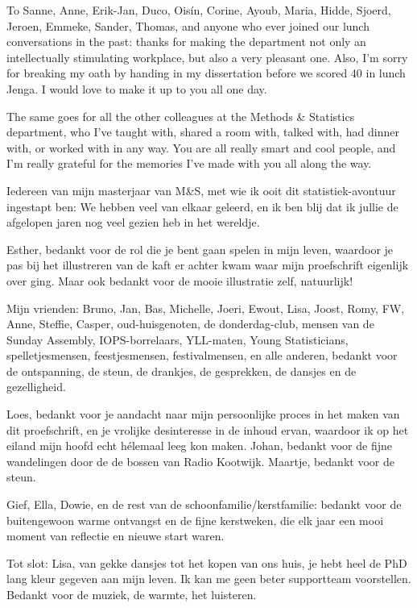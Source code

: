 \documentclass[12pt, a4paper]{book}\usepackage[]{graphicx}\usepackage{xcolor}
\begin{document}
To Sanne, Anne, Erik-Jan, Duco, Ois\'in, Corine, Ayoub, Maria, Hidde, Sjoerd, Jeroen, Emmeke, Sander, Thomas, and anyone who ever joined our lunch conversations in the past: thanks for making the department not only an intellectually stimulating workplace, but also a very pleasant one. Also, I'm sorry for breaking my oath by handing in my dissertation before we scored 40 in lunch Jenga. I would love to make it up to you all one day.

The same goes for all the other colleagues at the Methods \& Statistics department, who I've taught with, shared a room with, talked with, had dinner with, or worked with in any way. You are all really smart and cool people, and I'm really grateful for the memories I've made with you all along the way.

\vspace{.5cm}

Iedereen van mijn masterjaar van M\&S, met wie ik ooit dit statistiek-avontuur ingestapt ben: We hebben veel van elkaar geleerd, en ik ben blij dat ik jullie de afgelopen jaren nog veel gezien heb in het wereldje.

Esther, bedankt voor de rol die je bent gaan spelen in mijn leven, waardoor je pas bij het illustreren van de kaft er achter kwam waar mijn proefschrift eigenlijk over ging. Maar ook bedankt voor de mooie illustratie zelf, natuurlijk!

Mijn vrienden: Bruno, Jan, Bas, Michelle, Joeri, Ewout, Lisa, Joost, Romy, FW, Anne, Steffie, Casper, oud-huisgenoten, de donderdag-club, mensen van de Sunday Assembly, IOPS-borrelaars, YLL-maten, Young Statisticians, spelletjesmensen, feestjesmensen,  festivalmensen, en alle anderen, bedankt voor de ontspanning, de steun, de drankjes, de gesprekken, de dansjes en de gezelligheid.

Loes, bedankt voor je aandacht naar mijn persoonlijke proces in het maken van dit proefschrift, en je vrolijke desinteresse in de inhoud ervan, waardoor ik op het eiland mijn hoofd echt h\'elemaal leeg kon maken. Johan, bedankt voor de fijne wandelingen door de de bossen van Radio Kootwijk. Maartje, bedankt voor de steun.

Gief, Ella, Dowie, en de rest van de schoonfamilie/kerstfamilie: bedankt voor de buitengewoon warme ontvangst en de fijne kerstweken, die elk jaar een mooi moment van reflectie en nieuwe start waren.

Tot slot: Lisa, van gekke dansjes tot het kopen van ons huis, je hebt heel de PhD lang kleur gegeven aan mijn leven. Ik kan me geen beter supportteam voorstellen. Bedankt voor de muziek, de warmte, het luisteren.
\end{document}
